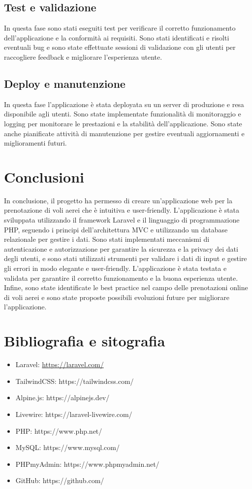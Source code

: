 \documentclass{article}
\begin{document}
\subsection{Test e validazione}

In questa fase sono stati eseguiti test per verificare il corretto funzionamento dell'applicazione e la conformità ai requisiti. Sono stati identificati e risolti eventuali bug e sono state effettuate sessioni di validazione con gli utenti per raccogliere feedback e migliorare l'esperienza utente.
\subsection{Deploy e manutenzione}

In questa fase l'applicazione è stata deployata su un server di produzione e resa disponibile agli utenti. Sono state implementate funzionalità di monitoraggio e logging per monitorare le prestazioni e la stabilità dell'applicazione. Sono state anche pianificate attività di manutenzione per gestire eventuali aggiornamenti e miglioramenti futuri.



\section{Conclusioni}
In conclusione, il progetto ha permesso di creare un'applicazione web per la prenotazione di voli aerei che è intuitiva e user-friendly. L'applicazione è stata sviluppata utilizzando il framework Laravel e il linguaggio di programmazione PHP, seguendo i principi dell'architettura MVC e utilizzando un database relazionale per gestire i dati. Sono stati implementati meccanismi di autenticazione e autorizzazione per garantire la sicurezza e la privacy dei dati degli utenti, e sono stati utilizzati strumenti per validare i dati di input e gestire gli errori in modo elegante e user-friendly. L'applicazione è stata testata e validata per garantire il corretto funzionamento e la buona esperienza utente. Infine, sono state identificate le best practice nel campo delle prenotazioni online di voli aerei e sono state proposte possibili evoluzioni future per migliorare l'applicazione.
\section{Bibliografia e sitografia}
\begin{itemize}
    \item Laravel: \url{https://laravel.com/}
    \item TailwindCSS: https://tailwindcss.com/
    \item Alpine.js: https://alpinejs.dev/
    \item Livewire: https://laravel-livewire.com/
    \item PHP: https://www.php.net/
    \item MySQL: https://www.mysql.com/
    \item PHPmyAdmin: https://www.phpmyadmin.net/
    \item GitHub: https://github.com/
\end{itemize}
\end{document}
